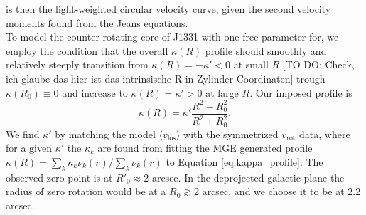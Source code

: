 is then the light-weighted circular velocity curve, given the second velocity moments found from the Jeans equations.
\\To model the counter-rotating core of J1331 with one free parameter for, we employ the condition that the overall $\kappa(R)$ profile should smoothly and relatively steeply transition from $\kappa(R) = -\kappa' < 0$ at small $R$ [TO DO: Check, ich glaube das hier ist das intrinsische R in Zylinder-Coordinaten] trough $\kappa(R_0) \equiv 0$ and increase to $\kappa(R) = \kappa' > 0$ at large $R$. Our imposed profile is
\begin{equation}
\kappa(R) = \kappa' \frac{R^2 - R_0^2}{R^2 + R_0^2}. \label{eq:kappa_profile}
\end{equation}
We find $\kappa'$ by matching the model $\langle v_\text{los} \rangle$ with the symmetrized $v_\text{rot}$ data, where for a given $\kappa'$ the $\kappa_k$ are found from fitting the MGE generated profile $\kappa(R) = \sum_k \kappa_k \nu_k(r)/\sum_k \nu_k(r)$ to Equation \ref{eq:kappa_profile}. The observed zero point is at $R'_0\approx 2$ arcsec. In the deprojected galactic plane the radius of zero rotation would be at a $R_0 \gtrsim 2$ arcsec, and we choose it to be at 2.2 arcsec.
